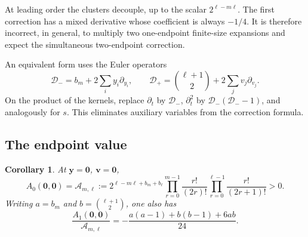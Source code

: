 \documentclass[11pt,a4paper]{article}
\numberwithin{equation}{section}
\newtheorem{corollary}[theorem]{Corollary}
\theoremstyle{definition}
\theoremstyle{remark}
\newcommand{\by}{\boldsymbol{y}}
\newcommand{\bv}{\boldsymbol v}
\begin{document}
At leading order the clusters decouple, up to the scalar
$2^{\ell-m\ell}$. The first correction has a mixed derivative whose
coefficient is always $-1/4$. It is therefore incorrect, in general, to
multiply two one-endpoint finite-size expansions and expect the
simultaneous two-endpoint correction.

An equivalent form uses the Euler operators
\begin{equation}\label{tec:eq:euler}
 \mathcal D_-=b_m+2\sum_i y_i\partial_{y_i},\qquad
 \mathcal D_+=\binom{\ell+1}{2}+2\sum_jv_j\partial_{v_j}.
\end{equation}
On the product of the kernels, replace $\partial_t$ by $\mathcal D_-$,
$\partial_t^2$ by $\mathcal D_-(\mathcal D_--1)$, and analogously for
$s$. This eliminates auxiliary variables from the correction formula.

\subsection{The endpoint value}
\begin{corollary}\label{tec:cor:endpoint}
At $\by=\boldsymbol0$, $\bv=\boldsymbol0$,
\begin{equation}\label{tec:eq:Aendpoint}
 A_0(\boldsymbol0,\boldsymbol0)=
 \mathcal A_{m,\ell}:=
 2^{\ell-m\ell+b_m+b_\ell}
 \prod_{r=0}^{m-1}\frac{r!}{(2r)!}
 \prod_{r=0}^{\ell-1}\frac{r!}{(2r+1)!}>0.
\end{equation}
Writing $a=b_m$ and $b=\binom{\ell+1}{2}$, one also has
\begin{equation}\label{tec:eq:Aendpoint1}
 \frac{A_1(\boldsymbol0,\boldsymbol0)}{\mathcal A_{m,\ell}}
 =-\frac{a(a-1)+b(b-1)+6ab}{24}.
\end{equation}
\end{corollary}
\end{document}
